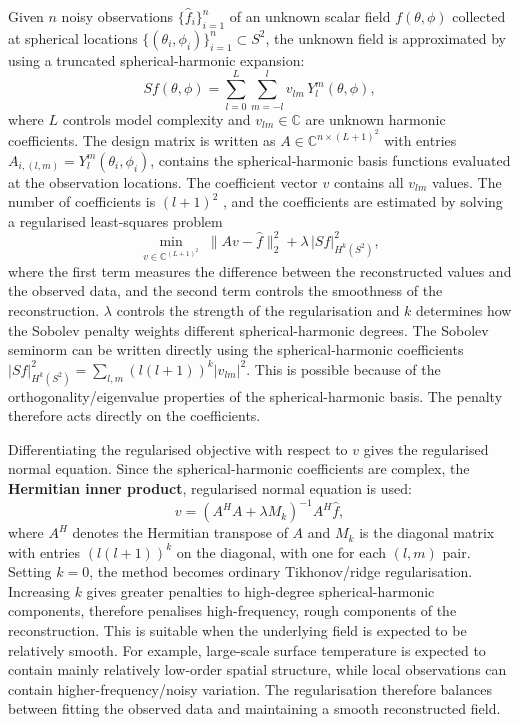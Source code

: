 Given $n$ noisy observations $\{\hat f_i\}_{i=1}^n$ of an unknown scalar field $f(\theta,\phi)$ collected at spherical locations $\{(\theta_i,\phi_i)\}_{i=1}^n \subset S^2$, the unknown field is approximated by using a truncated spherical-harmonic expansion:
\begin{equation}
    Sf(\theta,\phi) = \sum_{l=0}^{L}\sum_{m=-l}^{l} v_{lm}\, Y_l^m(\theta,\phi),
    \label{eq:truncated-expansion}
\end{equation}
where $L$ controls model complexity and $v_{lm} \in \mathbb{C}$ are unknown harmonic coefficients. The design matrix is written as $A \in \mathbb{C}^{n \times (L+1)^2}$ with entries $A_{i,(l,m)} = Y_l^m(\theta_i,\phi_i)$,  contains the spherical-harmonic basis functions evaluated at the observation locations. The coefficient vector $v$ contains all $v_{lm}$ values. The number of coefficients is $(l+1)^2$ , and the coefficients are estimated by solving a regularised least-squares problem
\begin{equation}
    \min_{v \in \mathbb{C}^{(L+1)^2}} \; \|Av - \hat f\|_2^2 + \lambda\, |Sf|^2_{H^k(S^2)},
    \label{eq:reg-lsq}
\end{equation}
where the first term measures the difference between the reconstructed values and the observed data, and the second term controls the smoothness of the reconstruction. $\lambda$ controls the strength of the regularisation and $k$ determines how the Sobolev penalty weights different spherical-harmonic degrees. The Sobolev seminorm can be written directly using the spherical-harmonic coefficients $|Sf|^2_{H^k(S^2)} = \sum_{l,m} (l(l+1))^k |v_{lm}|^2$. This is possible because of the orthogonality/eigenvalue properties of the spherical-harmonic basis. The penalty therefore acts directly on the coefficients. 

Differentiating the regularised objective with respect to $v$ gives the regularised normal equation. Since the spherical-harmonic coefficients are complex, the \textbf{Hermitian inner product}, regularised normal equation is used:
\begin{equation}
    v = \left(A^H A + \lambda M_k\right)^{-1} A^H \hat f,
    \label{eq:normal-eq}
\end{equation}
where $A^H$ denotes the Hermitian transpose of $A$ and $M_k$ is the diagonal matrix with entries $(l(l+1))^k$ on the diagonal, with one for each $(l,m)$ pair. Setting $k=0$, the method becomes ordinary Tikhonov/ridge regularisation. Increasing $k$ gives greater penalties to high-degree spherical-harmonic components, therefore penalises high-frequency, rough components of the reconstruction. This is suitable when the underlying field is expected to be relatively smooth. For example, large-scale surface temperature is expected to contain mainly relatively low-order spatial structure, while local observations can contain higher-frequency/noisy variation. The regularisation therefore balances between fitting the observed data and maintaining a smooth reconstructed field. 

